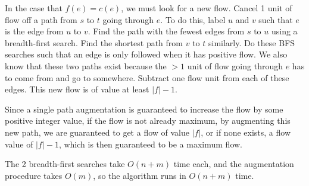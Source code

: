 \documentclass{article}
\begin{document}
In the case that $f(e) = c(e)$, we must look for a new flow. Cancel 1 unit of flow
off a path from $s$ to $t$ going through $e$. To do this, label $u$ and $v$
such that $e$ is the edge from $u$ to $v$. Find the path with
the fewest edges from $s$ to $u$ using a breadth-first search. Find the
shortest path from $v$ to $t$ similarly. Do these BFS searches such that an
edge is only followed when it has positive flow. We also know that these two
paths exist because the $> 1$ unit of flow going through $e$ has to come from
and go to somewhere. Subtract one flow unit from each of these edges. This new
flow is of value at least $|f| - 1$.

Since a single path augmentation is guaranteed to increase the flow by some
positive integer value, if the flow is not already maximum, by augmenting this
new path, we are guaranteed to get a flow of value $|f|$, or if none exists, a
flow value of $|f| - 1$, which is then guaranteed to be a maximum flow.

The 2 breadth-first searches take $O(n+m)$ time each, and the augmentation
procedure takes $O(m)$, so the algorithm runs in $O(n+m)$ time.
\end{document}
